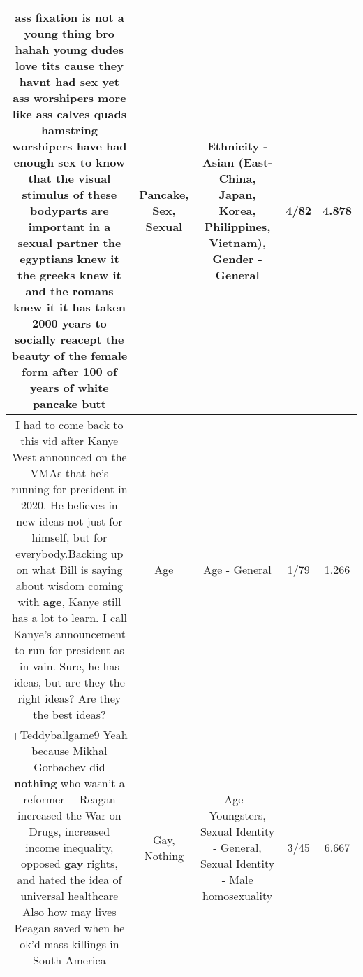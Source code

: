\documentclass[11pt]{article}
\newlength\mylength
\begin{document}
\begin{center}
\begin{longtable}{|C{.65\mylength}|C{.30\mylength}|C{.12\mylength}|C{.12\mylength}|C{.12\mylength}|}
  \small ass fixation is not a young thing bro hahah young dudes love tits cause they havnt had \textbf{sex} yet  ass worshipers more like ass calves quads hamstring worshipers have had enough \textbf{sex} to know that the visual stimulus of these bodyparts are important in a \textbf{sexual} partner the egyptians knew it the greeks knew it and the romans knew it it has taken 2000 years to socially reacept the beauty of the female form after 100 of years of white \textbf{pancake} butt\normalsize   & Pancake, Sex, Sexual & Ethnicity - Asian (East- China, Japan, Korea, Philippines, Vietnam), Gender - General & 4/82 & 4.878 \\  \hline
  \small I had to come back to this vid after Kanye West announced on the VMAs that he's running for president in 2020. He believes in new ideas not just for himself, but for everybody.Backing up on what Bill is saying about wisdom coming with \textbf{age}, Kanye still has a lot to learn. I call Kanye's announcement to run for president as in vain. Sure, he has ideas, but are they the right ideas? Are they the best ideas?\normalsize   & Age & Age - General & 1/79 & 1.266 \\  \hline
  \small +Teddyballgame9 Yeah because Mikhal Gorbachev did \textbf{nothing} who wasn't a reformer - -Reagan increased the War on Drugs, increased income  inequality, opposed \textbf{g\textbf{ay}} rights, and hated the idea of universal healthcare Also how may lives Reagan saved when he ok'd mass killings in South America\normalsize   & Gay, Nothing & Age - Youngsters, Sexual Identity - General, Sexual Identity - Male homosexuality & 3/45 & 6.667 \\  \hline

\end{longtable}
\end{center}
\end{document}
